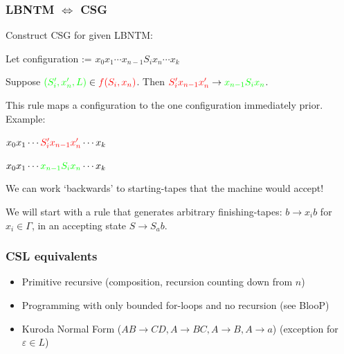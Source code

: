 \documentclass[languages_and_machines.tex]{subfiles}
\begin{document}
\begin{frame}
  \frametitle{LBNTM \(\iff\) CSG}

  Construct CSG for given LBNTM:

  Let configuration := \(x_0 x_1 \dotsb x_{n-1} S_i x_n \dotsb x_k\)

  \pause

  Suppose \(\textcolor{green}{(S_i', x_n', L)} \in \textcolor{red}{f(S_i, x_n)}\). Then \(\textcolor{red}{S_i' x_{n-1} x_n'} \to \textcolor{green}{x_{n-1} S_i x_n}\).

  \pause

  This rule maps a configuration to the one configuration immediately prior. Example:

  \(x_0 x_1 \dotsb \textcolor{red}{S_i' x_{n-1} x_n'} \dotsb x_k\)

  \pause

  \(x_0 x_1 \dotsb \textcolor{green}{x_{n-1} S_i x_n} \dotsb x_k\)

  \pause

  We can work `backwards' to starting-tapes that the machine would accept!

  We will start with a rule that generates arbitrary finishing-tapes: \(b \to x_i b\) for \(x_i \in \Gamma\), in an accepting state \(S \to S_a b\).

\end{frame}

\begin{frame}
  \frametitle{CSL equivalents}

  \begin{itemize}
  \item Primitive recursive (composition, recursion counting down from \(n\))
    \pause
  \item Programming with only bounded for-loops and no recursion (see BlooP)
    \pause
  \item Kuroda Normal Form (\(AB \to CD, A \to BC, A \to B, A \to a\)) (exception for \(\varepsilon \in L\))
  \end{itemize}

\end{frame}
\end{document}

